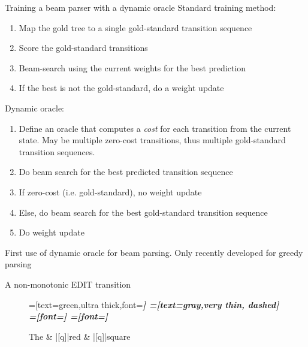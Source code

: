 \documentclass{lecture}
\begin{document}
\begin{points}{Training a beam parser with a dynamic oracle}
    \p Standard training method:\\
\begin{enumerate}
    \item Map the gold tree to a single gold-standard transition sequence
    \item Score the gold-standard transitions
    \item Beam-search using the current weights for the best prediction
    \item If the best is not the gold-standard, do a weight update
\end{enumerate}
\p Dynamic oracle:
\begin{enumerate}
    \item Define an oracle that computes a \emph{cost} for each transition from the current
   state. May be multiple zero-cost transitions, thus multiple gold-standard
   transition sequences.
    \item Do beam search for the best predicted transition sequence 
    \item If zero-cost (i.e. gold-standard), no weight update
    \item Else, do beam search for the best gold-standard transition sequence
    \item Do weight update
\end{enumerate}
\p First use of dynamic oracle for beam parsing. Only recently developed for
   greedy parsing
\end{points}


\begin{plain}{A non-monotonic EDIT transition}

\begin{figure}
    \centering
    \begin{dependency}[theme=simple]
    =[text=green,ultra thick,font=\bfseries\itshape]
    =[text=gray,very thin, dashed]
    =[font=\bfseries\itshape]
    =[font=\itshape]
    \begin{deptext}[column sep=.075cm, row sep=.1ex]
        The \& |[q]|red \& |[q]|square \\
    \end{deptext}
\end{dependency}
\end{figure}
\end{plain}
\end{document}
